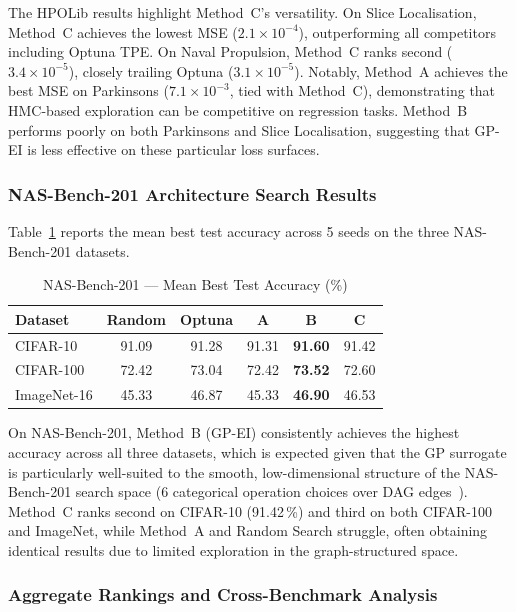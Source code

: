 \documentclass[11pt]{article}
\begin{document}
The HPOLib results highlight Method~C's versatility.  On Slice
Localisation, Method~C achieves the lowest MSE ($2.1 \times 10^{-4}$),
outperforming all competitors including Optuna TPE.  On Naval
Propulsion, Method~C ranks second ($3.4 \times 10^{-5}$), closely
trailing Optuna ($3.1 \times 10^{-5}$).  Notably, Method~A achieves the
best MSE on Parkinsons ($7.1 \times 10^{-3}$, tied with Method~C),
demonstrating that HMC-based exploration can be competitive on
regression tasks.  Method~B performs poorly on both Parkinsons and
Slice Localisation, suggesting that GP-EI is less effective on these
particular loss surfaces.

\subsubsection{NAS-Bench-201 Architecture Search Results}

Table~\ref{tab:nasbench_results} reports the mean best test accuracy
across 5 seeds on the three NAS-Bench-201 datasets.

\begin{table}[H]
\centering
\caption{NAS-Bench-201 — Mean Best Test Accuracy (\%)}
\label{tab:nasbench_results}
\renewcommand{\arraystretch}{1.15}
\begin{tabular}{lccccc}
\toprule
\textbf{Dataset} & \textbf{Random} & \textbf{Optuna} & \textbf{A} & \textbf{B} & \textbf{C} \\
\midrule
CIFAR-10       & 91.09 & 91.28 & 91.31 & \textbf{91.60} & 91.42 \\
CIFAR-100      & 72.42 & 73.04 & 72.42 & \textbf{73.52} & 72.60 \\
ImageNet-16    & 45.33 & 46.87 & 45.33 & \textbf{46.90} & 46.53 \\
\bottomrule
\end{tabular}
\end{table}

On NAS-Bench-201, Method~B (GP-EI) consistently achieves the highest
accuracy across all three datasets, which is expected given that the
GP surrogate is particularly well-suited to the smooth, low-dimensional
structure of the NAS-Bench-201 search space (6 categorical operation
choices over DAG edges~\cite{dong2020nasbench201}).  Method~C ranks
second on CIFAR-10 (91.42\,\%) and third on both CIFAR-100 and
ImageNet, while Method~A and Random Search struggle, often obtaining
identical results due to limited exploration in the graph-structured
space.

\subsubsection{Aggregate Rankings and Cross-Benchmark Analysis}
\end{document}
